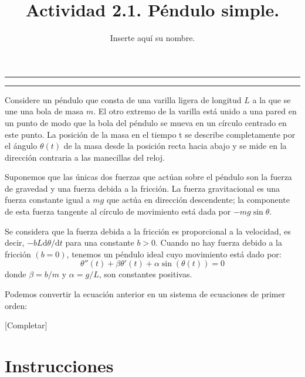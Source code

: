 \documentclass[11pt,letterpaper]{article}
\title{Actividad 2.1. Péndulo simple.}
\author{Inserte aquí su nombre.}
\begin{document}
\hrule
\begin{center}


\bigskip
\hrule
\end{center}
\bigskip{}

Considere un péndulo que consta de una varilla ligera de longitud $L$ a la que se une una bola de masa $m$. El otro extremo de la varilla está unido a una pared en un punto de modo que la bola del péndulo se mueva en un círculo centrado en este punto. La posición de la masa en el tiempo t se describe completamente por el ángulo $\theta(t)$ de la masa desde la posición recta hacia abajo y se mide en la dirección contraria a las manecillas del reloj.

Suponemos que las únicas dos fuerzas que actúan sobre el péndulo son la fuerza de gravedad y una fuerza debida a la fricción. La fuerza gravitacional es una fuerza constante igual a $ m g $ que actúa en dirección descendente; la componente de esta fuerza tangente al círculo de movimiento está dada por $ -m g \sin \theta $. 

Se considera que la fuerza debida a la fricción es proporcional a la velocidad, es decir, $ -b L \mathrm{d}\theta / \mathrm{d} t $ para una constante $ b> 0 $. Cuando no hay fuerza debido a la fricción $ (b = 0) $, tenemos un péndulo ideal cuyo movimiento está dado por:
\[ \theta ''(t) + \beta \theta '(t) + \alpha \sin(\theta(t)) = 0 \]
donde $\beta= b/m$ y $\alpha = g/L$, son constantes positivas. 

Podemos convertir la ecuación anterior en un sistema de ecuaciones de primer orden: 

{\color{red}[Completar]}

\section*{Instrucciones}
\end{document}
